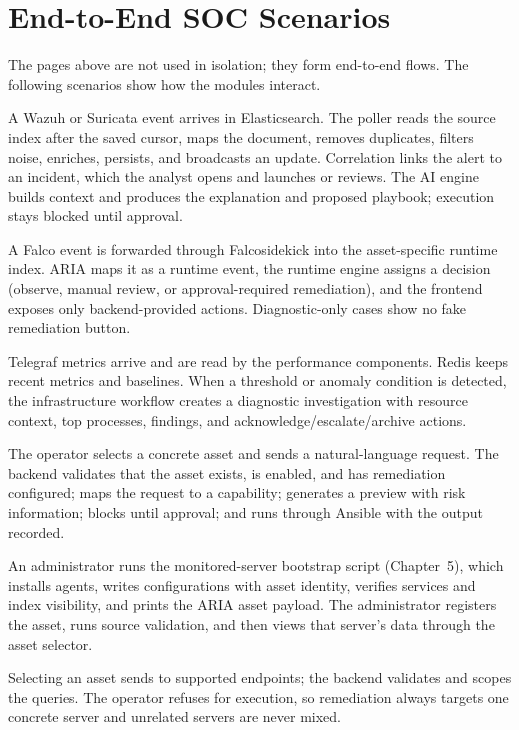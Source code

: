 \section{End-to-End SOC Scenarios}

The pages above are not used in isolation; they form end-to-end flows. The following scenarios show how the modules interact.

\begin{description}[leftmargin=0.6cm]
\item[Scenario 1 -- Security alert to investigation.] A Wazuh or Suricata event arrives in Elasticsearch. The poller reads the source index after the saved cursor, maps the document, removes duplicates, filters noise, enriches, persists, and broadcasts an update. Correlation links the alert to an incident, which the analyst opens and launches or reviews. The AI engine builds context and produces the explanation and proposed playbook; execution stays blocked until approval.
\item[Scenario 2 -- Runtime Falco event.] A Falco event is forwarded through Falcosidekick into the asset-specific runtime index. ARIA maps it as a runtime event, the runtime engine assigns a decision (observe, manual review, or approval-required remediation), and the frontend exposes only backend-provided actions. Diagnostic-only cases show no fake remediation button.
\item[Scenario 3 -- Infrastructure anomaly.] Telegraf metrics arrive and are read by the performance components. Redis keeps recent metrics and baselines. When a threshold or anomaly condition is detected, the infrastructure workflow creates a diagnostic investigation with resource context, top processes, findings, and acknowledge/escalate/archive actions.
\item[Scenario 4 -- Operator prompt to safe execution.] The operator selects a concrete asset and sends a natural-language request. The backend validates that the asset exists, is enabled, and has remediation configured; maps the request to a capability; generates a preview with risk information; blocks until approval; and runs through Ansible with the output recorded.
\item[Scenario 5 -- New server onboarding.] An administrator runs the monitored-server bootstrap script (Chapter~5), which installs agents, writes configurations with asset identity, verifies services and index visibility, and prints the ARIA asset payload. The administrator registers the asset, runs source validation, and then views that server's data through the asset selector.
\item[Scenario 6 -- Asset filtering prevents data mixing.] Selecting an asset sends  to supported endpoints; the backend validates and scopes the queries. The operator refuses  for execution, so remediation always targets one concrete server and unrelated servers are never mixed.
\end{description}

